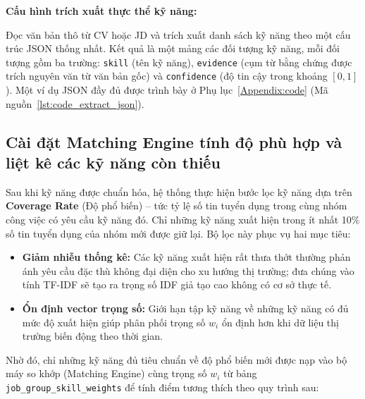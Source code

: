 \noindent
\vspace{2mm}
\textbf{Cấu hình trích xuất thực thể kỹ năng:}
\vspace{2mm}

\vspace{2mm}
Đọc văn bản thô từ CV hoặc JD và trích xuất danh sách kỹ năng theo một cấu trúc JSON thống nhất. Kết quả là một mảng các đối tượng kỹ năng, mỗi đối tượng gồm ba trường: \texttt{skill} (tên kỹ năng), \texttt{evidence} (cụm từ bằng chứng được trích nguyên văn từ văn bản gốc) và \texttt{confidence} (độ tin cậy trong khoảng $[0,1]$). Một ví dụ JSON đầy đủ được trình bày ở Phụ lục~\ref{Appendix:code} (Mã nguồn~\ref{lst:code_extract_json}).
\vspace{2mm}


\subsection{Cài đặt Matching Engine tính độ phù hợp và liệt kê các kỹ năng còn thiếu}

Sau khi kỹ năng được chuẩn hóa, hệ thống thực hiện bước lọc kỹ năng dựa trên \textbf{Coverage Rate} (Độ phổ biến) -- tức tỷ lệ số tin tuyển dụng trong cùng nhóm công việc có yêu cầu kỹ năng đó. Chỉ những kỹ năng xuất hiện trong ít nhất 10\% số tin tuyển dụng của nhóm mới được giữ lại. Bộ lọc này phục vụ hai mục tiêu:

\begin{itemize}
    \item \textbf{Giảm nhiễu thống kê:} Các kỹ năng xuất hiện rất thưa thớt thường phản ánh yêu cầu đặc thù không đại diện cho xu hướng thị trường; đưa chúng vào tính TF-IDF sẽ tạo ra trọng số IDF giả tạo cao không có cơ sở thực tế.
    \item \textbf{Ổn định vector trọng số:} Giới hạn tập kỹ năng về những kỹ năng có đủ mức độ xuất hiện giúp phân phối trọng số $w_i$ ổn định hơn khi dữ liệu thị trường biến động theo thời gian.
\end{itemize}

Nhờ đó, chỉ những kỹ năng đủ tiêu chuẩn về độ phổ biến mới được nạp vào bộ máy so khớp (Matching Engine) cùng trọng số $w_i$ từ bảng \texttt{job\_group\_skill\_weights} để tính điểm tương thích theo quy trình sau:

